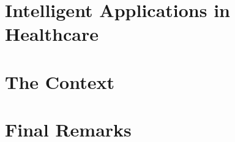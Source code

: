 \section{Intelligent Applications in Healthcare}




\section{The \ausl{} Context}

\section{Final Remarks}
